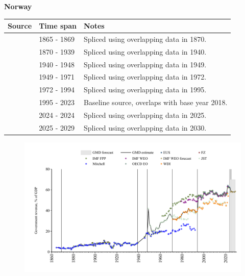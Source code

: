 \documentclass[12pt,a4paper,landscape]{article}
\begin{document}
\begin{adjustbox}{max totalsize={\paperwidth}{\paperheight},center}
\begin{minipage}[t][\textheight][t]{\textwidth}
\vspace*{0.5cm}
{}
\begin{center}
{\Large\bfseries Norway}
\end{center}
\vspace{0.5cm}
\begin{table}[H]
\centering
\small
\begin{tabular}{|l|l|l|}
\hline
\textbf{Source} & \textbf{Time span} & \textbf{Notes} \\
\hline
\rowcolor{white}\cite{Mitchell}& 1865 - 1869 &Spliced using overlapping data in 1870.\\
\rowcolor{lightgray}\cite{JST}& 1870 - 1939 &Spliced using overlapping data in 1940.\\
\rowcolor{white}\cite{IMF_FPP}& 1940 - 1948 &Spliced using overlapping data in 1949.\\
\rowcolor{lightgray}\cite{JST}& 1949 - 1971 &Spliced using overlapping data in 1972.\\
\rowcolor{white}\cite{WDI}& 1972 - 1994 &Spliced using overlapping data in 1995.\\
\rowcolor{lightgray}\cite{OECD_EO}& 1995 - 2023 &Baseline source, overlaps with base year 2018.\\
\rowcolor{white}\cite{EUS}& 2024 - 2024 &Spliced using overlapping data in 2025.\\
\rowcolor{lightgray}\cite{IMF_WEO_forecast}& 2025 - 2029 &Spliced using overlapping data in 2030.\\
\hline
\end{tabular}
\end{table}
\begin{figure}[H]
\centering
\includegraphics[width=\textwidth,height=0.6\textheight,keepaspectratio]{graphs/NOR_govrev_GDP.pdf}
\end{figure}
\end{minipage}
\end{adjustbox}
\end{document}
